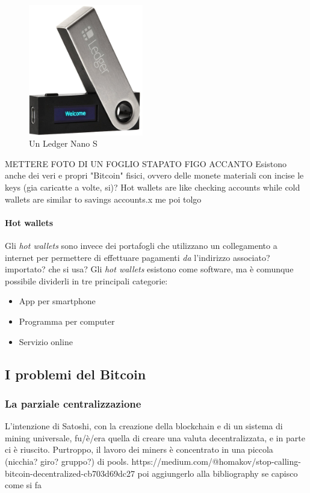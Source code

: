 \documentclass {article}
\begin{document}
\vspace {0.5cm}
\begin{figure}
\includegraphics [width = 5cm] {ledger.jpg}
\centering
\caption {Un Ledger Nano S}
\end{figure}
\vspace {0.2cm}
\noindent
METTERE FOTO DI UN FOGLIO STAPATO FIGO ACCANTO
Esistono anche dei veri e propri "Bitcoin" fisici, ovvero delle monete materiali con incise le keys (gia caricatte a volte, si)?
Hot wallets are like checking accounts while cold wallets are similar to savings accounts.x me poi tolgo

\paragraph {Hot wallets}


Gli \textit{hot wallets} sono invece dei portafogli che utilizzano un collegamento a internet per permettere di effettuare pagamenti \emph{da} l'indirizzo associato?importato? che si usa?
Gli \textit{hot wallets} esistono come software, ma è comunque possibile dividerli in tre principali categorie:

\begin{itemize}
\item App per smartphone
\item Programma per computer
\item Servizio online
\end{itemize}


\subsection {I problemi del Bitcoin}


\subsubsection {La parziale centralizzazione}


L'intenzione di Satoshi, con la creazione della blockchain e di un sistema di mining universale, fu/è/era quella di creare una valuta decentralizzata, e in parte ci è riuscito.
Purtroppo, il lavoro dei miners è concentrato in una piccola (nicchia? giro? gruppo?) di pools.
https://medium.com/@homakov/stop-calling-bitcoin-decentralized-cb703d69dc27 poi aggiungerlo alla bibliography se capisco come si fa
\end{document}
